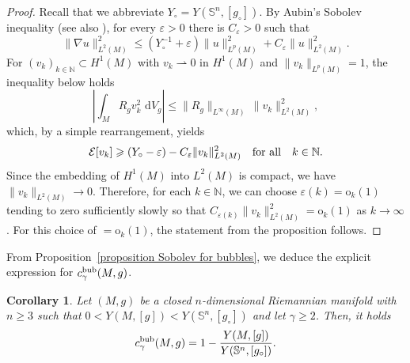 \documentclass[reqno,11pt]{amsart}
\numberwithin{equation}{section}
\newtheorem{corollary}[theorem]{Corollary}
\theoremstyle{definition}
\theoremstyle{remark}
\newcommand{\ud}{\,\mathrm{d}}
\newcommand{\Ss}{\mathbb{S}}
\newcommand{\eps}{\varepsilon}
\begin{document}
\begin{proof}
Recall that we abbreviate $Y_\circ = Y(\Ss^n,[g_\circ])$. 
    By Aubin's Sobolev inequality \cite{Aubin1976JDG} (see also \cite[Theorem 2.3]{LP}), for every $\eps > 0$ there is $C_\eps > 0$ such that 
    \[ \|\nabla u\|_{L^2(M)}^2 \leqslant (Y_\circ^{-1} + \eps) \|u\|_{L^p(M)}^2 + C_\eps \|u\|_{L^2(M)}^2. \]
    For $(v_k)_{k \in \mathbb{N}} \subset H^1(M)$ with $v_k \rightharpoonup 0$ in $H^1(M)$ and $\|v_k\|_{L^p(M)} = 1$, the inequality below holds 
    \[
    \left|\int_M R_g v_k^2 \, \ud V_g\right| \leqslant \|R_g\|_{L^\infty(M)}\, \|v_k\|_{L^2(M)}^2,
    \]
    which, by a simple rearrangement, yields
    \[ 
    \mathcal E[v_k] \geqslant (Y_\circ - \eps) - C_\eps \|v_k\|_{L^2(M)}^2 \quad {\rm for \ all} \quad k\in\mathbb{N}. 
    \]
    Since the embedding of $H^1(M)$ into $L^2(M)$ is compact, we have $\|v_k\|_{L^2(M)} \to 0$. 
    Therefore, for each $k\in\mathbb{N}$, we can choose $\eps(k)=\mathrm{o}_k(1)$ tending to zero sufficiently slowly so that $C_{\eps(k)} \|v_k\|_{L^2(M)}^2 =\mathrm{o}_k(1)$ as $k \to \infty$. For this choice of $=\mathrm{o}_k(1)$, the statement from the proposition follows.
\end{proof}

From Proposition~\ref{proposition Sobolev for bubbles}, we deduce the explicit expression 
for $c_{\gamma}^{\rm bub}(M,g)$.

\begin{corollary}
\label{cor:bubble-formula}
Let $(M,g)$ be a closed $n$-dimensional Riemannian manifold with $n \geqslant 3$ 
such that $0 < Y(M,[g]) < Y(\Ss^n,[g_\circ])$ and let $\gamma \geqslant 2$. Then, it holds
\begin{equation}\label{eq:bubble_formula}
    c_{\gamma}^{\rm bub}(M,g) = 1 - \frac{Y(M,[g])}{Y(\Ss^n,[g_\circ])}.
\end{equation}
\end{corollary}
\end{document}

